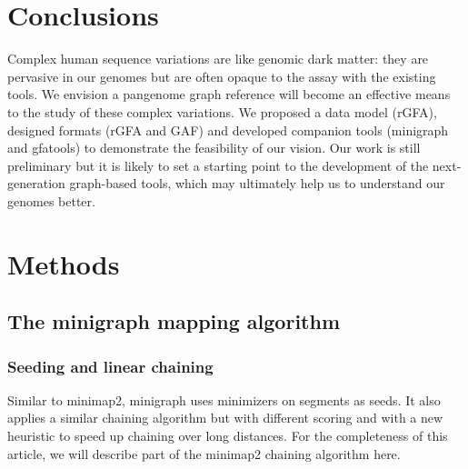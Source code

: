 \documentclass[twocolumn]{bmcart}%
\begin{document}
\section*{Conclusions}

Complex human sequence variations are like genomic dark matter: they are
pervasive in our genomes but are often opaque to the assay with the existing
tools. We envision a pangenome graph reference will become an effective
means to the study of these complex variations. We proposed a data model (rGFA),
designed formats (rGFA and GAF) and developed companion tools (minigraph and
gfatools) to demonstrate the feasibility of our vision. Our work is still
preliminary but it is likely to set a starting point to the development of the
next-generation graph-based tools, which may ultimately help us to understand
our genomes better.

\section*{Methods}

\subsection*{The minigraph mapping algorithm}

\subsubsection*{Seeding and linear chaining}
Similar to minimap2, minigraph uses minimizers on segments as seeds. It also
applies a similar chaining algorithm but with different scoring and with a new
heuristic to speed up chaining over long distances. For the completeness of
this article, we will describe part of the minimap2 chaining algorithm here.
\end{document}
